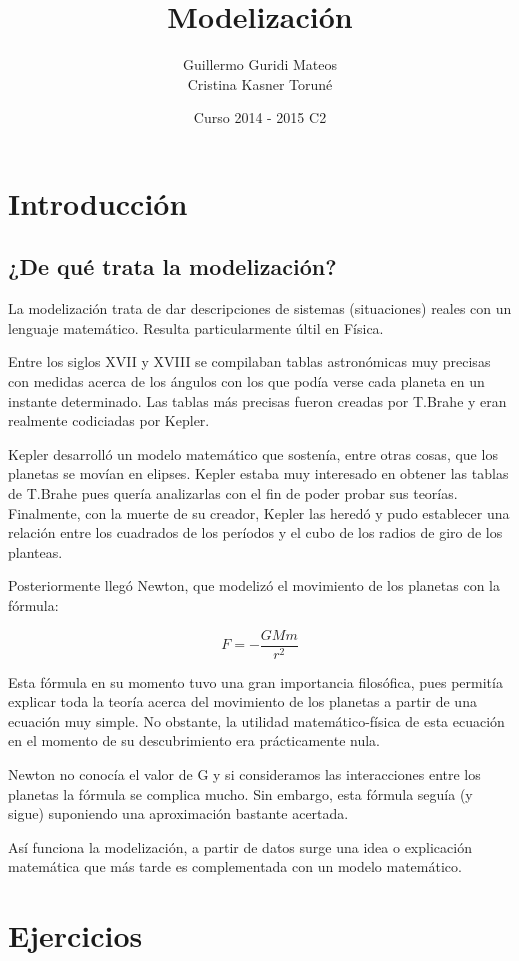 \documentclass{apuntes}
\title{Modelización}
\author{Guillermo Guridi Mateos\\Cristina Kasner Toruné}
\date{Curso 2014 - 2015 C2}
\begin{document}
\pagestyle{plain}
\maketitle

\tableofcontents
\newpage

\chapter{Introducción}

\section{¿De qué trata la modelización?}

La modelización trata de dar descripciones de sistemas (situaciones) reales con un lenguaje matemático. Resulta particularmente últil en Física.

Entre los siglos XVII y XVIII se compilaban tablas astronómicas muy precisas con medidas acerca de los ángulos con los que podía verse cada planeta en un instante determinado. Las tablas más precisas fueron creadas por T.Brahe y eran realmente codiciadas por Kepler.

Kepler desarrolló un modelo matemático que sostenía, entre otras cosas, que los planetas se movían en elipses. Kepler estaba muy interesado en obtener las tablas de T.Brahe pues quería analizarlas con el fin de poder probar sus teorías. Finalmente, con la muerte de su creador, Kepler las heredó y pudo establecer una relación entre los cuadrados de los períodos y el cubo de los radios de giro de los planteas.

Posteriormente llegó Newton, que modelizó el movimiento de los planetas con la fórmula:

$$F = - \frac{GMm}{r^2}$$

Esta fórmula en su momento tuvo una gran importancia filosófica, pues permitía explicar toda la teoría acerca del movimiento de los planetas a partir de una ecuación muy simple. No obstante, la utilidad matemático-física de esta ecuación en el momento de su descubrimiento era prácticamente nula.

Newton no conocía el valor de G y si consideramos las interacciones entre los planetas la fórmula se complica mucho. Sin embargo, esta fórmula seguía (y sigue) suponiendo una aproximación bastante acertada.

Así funciona la modelización, a partir de datos surge una idea o explicación matemática que más tarde es complementada con un modelo matemático.




\appendix

\chapter{Ejercicios}

\printindex
\end{document}

